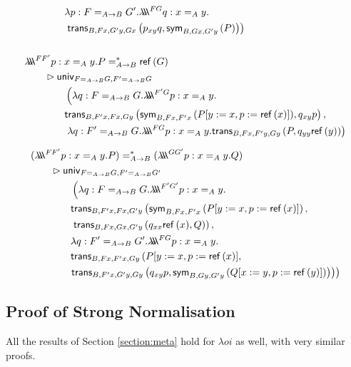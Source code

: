\begin{align*}
& \qquad \qquad \lambda p : F =_{A \rightarrow B} G'. \triplelambda^{F G} q : x =_A y. \\
& \qquad \qquad \left. \trans{B}{Fx}{G'y}{Gx}{p_{xy} q}{\sym{B}{Gx}{G'y}{P}} \right) \\ \\
& \triplelambda^{F F'} p : x =_A y. P =^*_{A \rightarrow B} \reff{G}
  \\ & \qquad \rhd
\mathsf{univ}_{F =_{A \rightarrow B} G,F' =_{A \rightarrow B} G} \\
& \qquad \qquad \left( \lambda q : F =_{A \rightarrow B} G .
\triplelambda^{F' G} p : x =_A y. \right. \\
& \qquad \qquad \trans{B}{F'x}{Fx}{Gy}{\sym{B}{Fx}{F'x}{P [ y := x, p := \reff{x} ] }}
{
 q_{xy}p}, \\
& \qquad \qquad \left. \lambda q:F'=_{A \rightarrow B} G. \triplelambda^{FG} p : x =_A y.
\trans{B}{Fx}{F'y}{Gy}{P}{q_{yy} \reff{y}} \right)
\end{align*}

\begin{align*}
& (\triplelambda^{F F'} p : x =_A y. P) =^*_{A \rightarrow B} (\triplelambda^{G G'} p : x =_A y . Q)
 \\ & \qquad \rhd 
\mathsf{univ}_{F =_{A \rightarrow B} G,F' =_{A \rightarrow B} G'} \\
& \qquad \qquad \left( \lambda q : F =_{A \rightarrow B} G . \triplelambda^{F' G'} p : x =_A y. \right. \\
& \qquad \qquad \mathsf{trans}_{B,F'x,Fx,G'y} \left( \sym{B}{Fx}{F'x}{P [ y := x, p := \reff{x} ]} , \right. \\
& \qquad \qquad \left. \trans{B}{Fx}{Gx}{G'y}{q_{xx} \reff{x}}{Q} \right) , \\
& \qquad \qquad \lambda q : F' =_{A \rightarrow B} G' . \triplelambda^{FG} p : x =_A y. \\
& \qquad \qquad \mathsf{trans}_{B, Fx, F'x, Gy} \left( P [ y := x,  p := \reff{x} ] , \right. \\
& \qquad \qquad \! \! \left. \left. \trans{B}{F'x}{G'y}{Gy}{q_{xy} p}{\sym{B}{Gy}{G'y}{Q [ x := y, p := \reff{y} ] }} \right) \right)
\end{align*}

\subsection{Proof of Strong Normalisation}

All the results of Section \ref{section:meta} hold for $\lambda o i$ as well,
with very similar proofs.

